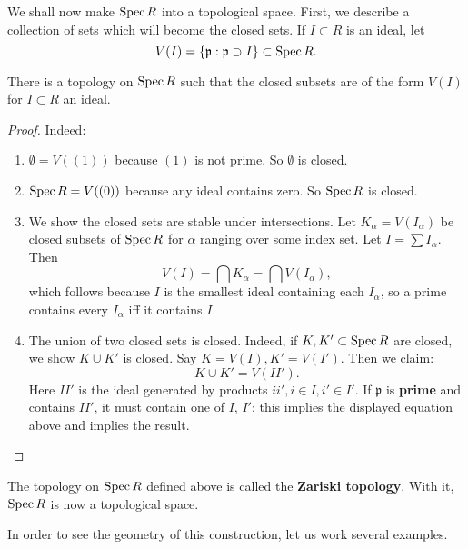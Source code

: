 We shall now make $\operatorname{Spec} R$ into a topological space. First, we
describe a
collection of sets which will become the closed sets. 
If $I \subset R$ is an ideal, let
\[ V(I) = \left\{\mathfrak{p}: \mathfrak{p} \supset I\right\}
\subset \operatorname{Spec} R.
\]

\begin{proposition} 
There is a topology on $\operatorname{Spec} R$ such that the closed subsets
are of the form
$V(I)$ for $I \subset R$ an ideal.
\end{proposition} 

\begin{proof} 
Indeed:
\begin{enumerate}
\item $\emptyset = V((1))$ because $(1)$ is not prime. So
$\emptyset$ is closed.
\item $\operatorname{Spec} R = V((0))$ because any ideal contains zero. So
$\operatorname{Spec} R$ is
closed.
\item We show the closed sets are stable under intersections.
Let
$K_{\alpha} = V(I_{\alpha})$ be closed subsets of $\operatorname{Spec} R$ for
$\alpha$
ranging over some index set.  Let $I
= \sum I_{\alpha}$. Then 
\[ V(I) = \bigcap K_{\alpha} = \bigcap V(I_{\alpha}),  \]
which follows because $I$ is the smallest ideal containing each
$I_{\alpha}$,
so a prime contains every $I_{\alpha}$ iff it contains $I$.  
\item The union of two closed sets is closed. Indeed, if $K,K'
\subset \operatorname{Spec}
R$ are closed, we show $K \cup K'$ is closed. Say $K= V(I), K' =
V(I')$. Then
we claim: 
\[ K \cup K'  = V(II').  \]
Here $II'$ is the ideal generated by products $ii', i \in I, i'
\in I'$. If
$\mathfrak{p}$ is \textbf{prime} and contains $II'$, it must
contain one of $I$, $I'$;
this implies the displayed equation above and implies the
result.
\end{enumerate}
\end{proof} 
\begin{definition} 
The topology on $\operatorname{Spec} R$ defined above is called the
\textbf{Zariski
topology}. With it,  $\operatorname{Spec} R$ is now a topological space.
\end{definition} 

In order to see the geometry of this construction, let us work
several examples.

